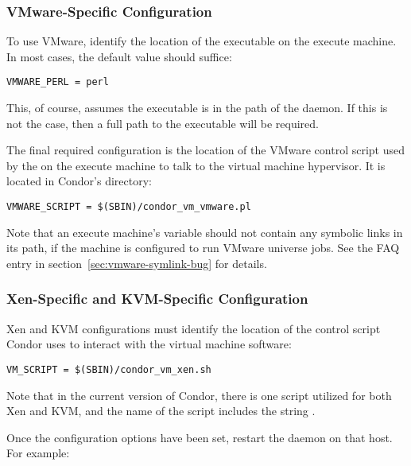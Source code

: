 \subsubsection{VMware-Specific Configuration}

To use VMware, identify the location of the  executable
on the execute machine.
In most cases, the default value should suffice:

\begin{verbatim}
VMWARE_PERL = perl
\end{verbatim}

This, of course, assumes the  executable is in the path
of the  daemon.
If this is not the case,
then a full path to the  executable will be required.

The final required configuration is the location of the VMware control script
used by the  on the execute machine
to talk to the virtual machine hypervisor.
It is located in Condor's  directory:

\begin{verbatim}
VMWARE_SCRIPT = $(SBIN)/condor_vm_vmware.pl
\end{verbatim}

Note that an execute machine's  variable should not
contain any symbolic links in its path,
if the machine is configured to run VMware  universe jobs.
See the FAQ entry in section~\ref{sec:vmware-symlink-bug} for details.

\subsubsection{Xen-Specific and KVM-Specific Configuration}

Xen and KVM configurations must identify the location of the control script
Condor uses to interact with the virtual machine software:

\begin{verbatim}
VM_SCRIPT = $(SBIN)/condor_vm_xen.sh
\end{verbatim}

Note that in the current version of Condor,
there is one script utilized for both Xen and KVM,
and the name of the script  includes the string .

Once the configuration options have been set, restart the  
daemon on that host.  For example:

